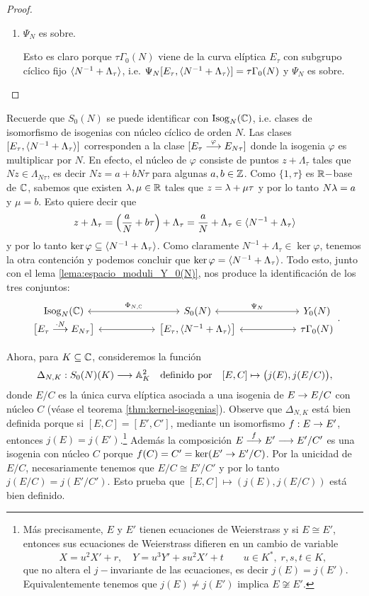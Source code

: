 \documentclass[../../tesis_maestria]{subfiles}
\begin{document}
\begin{proof}
\begin{enumerate}[label=\emph{\roman*})]
  \item $\Psi_N$ es sobre.
  
  \-\;\; Esto es claro porque $\tau\Gamma_0(N)$ viene de la curva elíptica $E_\tau$ con subgrupo cíclico fijo $\langle N^{-1}+\Lambda_\tau \rangle$, i.e. $\Psi_N[E_\tau,\langle N^{-1}+\Lambda_\tau \rangle]=\tau\Gamma_0(N)$ y $\Psi_N$ es sobre.
\end{enumerate}
\end{proof}

\begin{nota}
	Recuerde que $S_0(N)$ se puede identificar con $\mathrm{Isog}_N(\mathbb{C})$, i.e. clases de isomorfismo de isogenias con núcleo cíclico de orden $N$. Las clases $[E_\tau,\langle N^{-1}+\Lambda_\tau \rangle]$ corresponden a la clase $[E_\tau\overset{\varphi}{\longrightarrow} E_{N\tau}]$ donde la isogenia $\varphi$ es multiplicar por $N$. En efecto, el núcleo de $\varphi$ consiste de puntos $z+\Lambda_\tau$ tales que $Nz\in\Lambda_{N\tau}$, es decir $Nz=a+bN\tau$ para algunas $a,b\in\mathbb{Z}$. Como $\{1,\tau\}$ es $\mathbb{R}-$base de $\mathbb{C}$, sabemos que existen $\lambda,\mu\in\mathbb{R}$ tales que $z=\lambda+\mu\tau$ y por lo tanto $N\lambda=a$ y $\mu=b$. Esto quiere decir que 
	\[
	z+\Lambda_\tau=\left(\frac{a}{N}+b\tau\right)+\Lambda_\tau=\frac{a}{N}+\Lambda_\tau\in\langle N^{-1}+\Lambda_\tau \rangle
	\]
y por lo tanto $\ker\varphi\subseteq\langle N^{-1}+\Lambda_\tau \rangle$. Como claramente $N^{-1}+\Lambda_\tau\in\ker\varphi$, tenemos la otra contención y podemos concluir que $\ker\varphi=\langle N^{-1}+\Lambda_\tau \rangle$. Todo esto, junto con el lema \ref{lema:espacio_moduli_Y_0(N)}, nos produce la identificación de los tres conjuntos:
\[
	\begin{tikzcd}[row sep=-1mm,column sep=20mm]
		\mathrm{Isog}_N(\CC) \arrow[r, leftrightarrow,"\Phi_{N,\CC}"] & S_0(N) \arrow[r,leftrightarrow,"\Psi_N"] & Y_0(N) \\
		\big[E_{\tau}\morf{\cdot N} E_{N\tau}\big] \arrow[r,leftrightarrow] & \big[E_\tau,\gen{N^{-1}+\Lambda_\tau}\big] \arrow[r,leftrightarrow] & \tau\Gamma_0(N)
	\end{tikzcd}.
\]
\end{nota}


	Ahora, para $K\subseteq\mathbb{C}$, consideremos la función
	\[
		\Delta_{N,K}:S_0(N)(K)\longrightarrow\mathbb{A}^2_K \quad\text{definido por}\quad [E,C]\mapsto \big(j(E),j(E/C)\big),
	\]
donde $E/C$ es la única curva elíptica asociada a una isogenia de $E\rightarrow E/C$ con núcleo $C$ (véase el teorema \ref{thm:kernel-isogenias}). Observe que $\Delta_{N,K}$ está bien definida porque si $[E,C]=[E',C']$, mediante un isomorfismo $f:E\rightarrow E'$, entonces $j(E)=j(E')$.\footnote{\label{footnote-j-inv}Más precisamente, $E$ y $E'$ tienen ecuaciones de Weierstrass y si $E\cong E'$, entonces sus ecuaciones de Weierstrass difieren en un cambio de variable
\[
	X=u^2X'+r,\quad Y=u^3Y'+su^2X'+t \qquad u\in K^*,\; r,s,t\in K,
\]
que no altera el $j-$invariante de las ecuaciones, es decir $j(E)=j(E')$. Equivalentemente tenemos que $j(E)\neq j(E')$ implica $E\not\cong E'$.} Además la composición $E\overset{f}{\longrightarrow}E'\longrightarrow E'/C'$ es una isogenia con núcleo $C$ porque $f(C)=C'=\ker(E'\rightarrow E'/C)$. Por la unicidad de $E/C$, necesariamente tenemos que $E/C\cong E'/C'$ y por lo tanto $j(E/C)=j(E'/C')$. Esto prueba que $[E,C]\mapsto(j(E),j(E/C))$ está bien definido.
\end{document}
